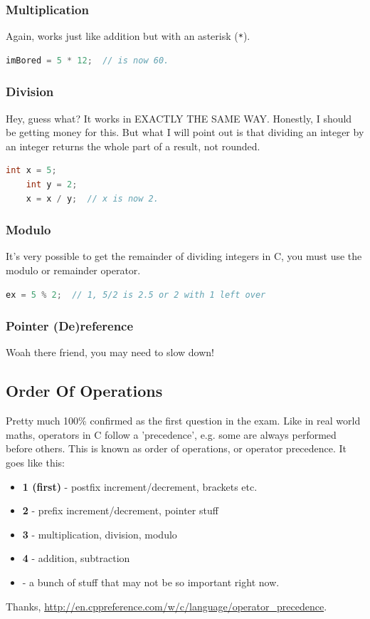 \subsubsection{Multiplication}
Again, works just like addition but with an asterisk (\texttt{*}).
\begin{lstlisting}[language=C]
    imBored = 5 * 12;  // is now 60.
\end{lstlisting}

\subsubsection{Division}
Hey, guess what? It works in EXACTLY THE SAME WAY. Honestly, I should be getting money for this. But what I will point out is that dividing an integer by an integer returns the whole part of a result, not rounded.
\begin{lstlisting}[language=C]
    int x = 5;
    int y = 2;
    x = x / y;  // x is now 2.
\end{lstlisting}

\subsubsection{Modulo}
It's very possible to get the remainder of dividing integers in C, you must use the modulo or remainder operator.
\begin{lstlisting}[language=C]
    ex = 5 % 2;  // 1, 5/2 is 2.5 or 2 with 1 left over
\end{lstlisting}

\subsubsection{Pointer (De)reference}
Woah there friend, you may need to slow down!

\subsection{Order Of Operations}
Pretty much 100\% confirmed as the first question in the exam. Like in real world maths, operators in C follow a 'precedence', e.g. some are always performed before others. This is known as order of operations, or operator precedence. It goes like this:
\begin{itemize}
    \item \textbf{1 (first)} - postfix increment/decrement, brackets etc.
    \item \textbf{2} - prefix increment/decrement, pointer stuff
    \item \textbf{3} - multiplication, division, modulo
    \item \textbf{4} - addition, subtraction
    \item {} - a bunch of stuff that may not be so important right now.
\end{itemize}
Thanks, \url{http://en.cppreference.com/w/c/language/operator_precedence}.

